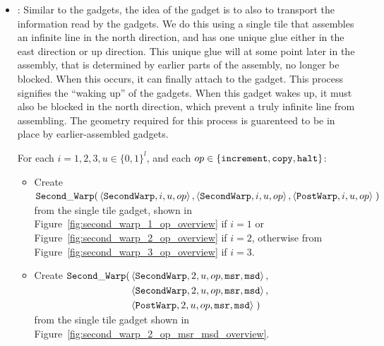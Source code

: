\begin{itemize}
    \item {\secondwarp}:
    Similar to the {\firstwarp} gadgets, the idea of the {\secondwarp} gadget is to
    also to transport the information read by the {\cread} gadgets. We do this using a single tile that
    assembles an infinite line in the north direction, and has one unique glue either in the
    east direction or up direction. This unique glue will at some point later in the assembly, that is
    determined by earlier parts of the assembly, no longer be blocked. When this occurs, it can
    finally attach to the {\postwarp} gadget. This process signifies the ``waking up'' of the
    {\secondwarp} gadgets. When this gadget wakes up, it must also be blocked in the north direction, which
    prevent a truly infinite line from assembling. The geometry required for this process is guarenteed
    to be in place by earlier-assembled {\dtop} gadgets.


    For each $i = 1,2,3, u \in \{0, 1\}^l$, and each $op \in \{ {\tt increment}, {\tt copy}, {\tt halt} \}$:
    \begin{itemize}
        \item Create
        $\begin{aligned}[t]
            \secondwarp(& \left\langle {\tt SecondWarp}, i, u, \inc \right\rangle,     %
                          \left\langle {\tt SecondWarp}, i, u, \inc \right\rangle,     %
                          \left\langle {\tt PostWarp},   i, u, \inc \right\rangle \;)  %
        \end{aligned}$\\ from the single tile gadget, shown in Figure~\ref{fig:second_warp_1_op_overview}
                         if $i = 1$ or Figure~\ref{fig:second_warp_2_op_overview} if $i = 2$, otherwise from
                         Figure~\ref{fig:second_warp_3_op_overview} if $i = 3$.
        \vspace{0.5cm}

        \item Create
        $\begin{aligned}[t]
            \secondwarp(& \left\langle {\tt SecondWarp}, 2, u, \inc, {\tt msr}, {\tt msd} \right\rangle, \\ %
                        & \left\langle {\tt SecondWarp}, 2, u, \inc, {\tt msr}, {\tt msd} \right\rangle, \\ %
                        & \left\langle {\tt PostWarp},   2, u, \inc, {\tt msr}, {\tt msd} \right\rangle \;) %
        \end{aligned}$\\ from the single tile gadget shown in Figure~\ref{fig:second_warp_2_op_msr_msd_overview}.
        \vspace{0.5cm}


\end{itemize}
\end{itemize}

